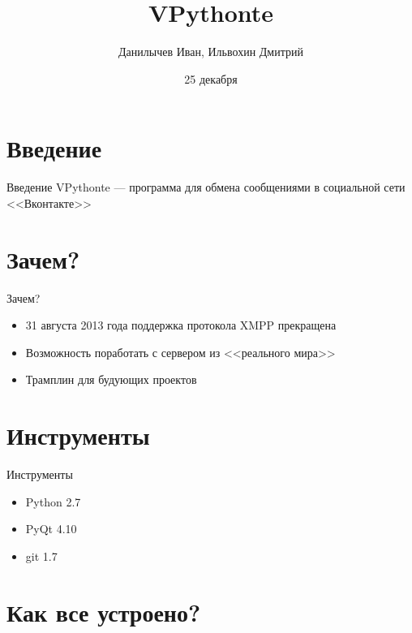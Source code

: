\documentclass{beamer}
\title[Проект по ООП]{VPythonte}
\author{Данилычев Иван, Ильвохин Дмитрий}
\institute{Московский авиационый институт}
\date{25 декабря}
\begin{document}
\begin{frame}
  \titlepage
\end{frame}


%

\section{Введение}
\begin{frame}{Введение}
VPythonte --- программа для обмена сообщениями в социальной сети <<Вконтакте>>
\end{frame}

\section{Зачем?}
\begin{frame}{Зачем?}
\begin{itemize}
\item<1-> 31 августа 2013 года поддержка протокола XMPP прекращена
\item<2-> Возможность поработать с сервером из <<реального мира>>
\item<3-> Трамплин для будующих проектов
\end{itemize}
\end{frame}

\section{Инструменты}
\begin{frame}{Инструменты}
\begin{itemize}
\item<1-> Python 2.7
\item<2-> PyQt 4.10
\item<3-> git 1.7
\end{itemize}
\end{frame}

\section{Как все устроено?}
\end{document}
